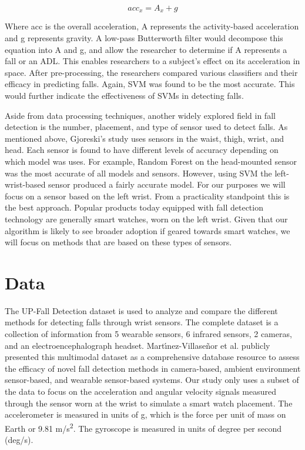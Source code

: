 \documentclass{llncs}
\begin{document}
    \begin{equation*}
    	acc_{x} = A_{x} + g
    \end{equation*}
    
    Where acc is the overall acceleration, A represents the activity-based acceleration and g represents gravity. A low-pass Butterworth filter would decompose this equation into A and g, and allow the researcher to determine if A represents a fall or an ADL. This enables researchers to a subject's effect on its acceleration in space. After pre-processing, the researchers compared various classifiers and their efficacy in predicting falls. Again, SVM was found to be the most accurate. This would further indicate the effectiveness of SVMs in detecting falls. \cite{hussainelderly2019}
    
    Aside from data processing techniques, another widely explored field in fall detection is the number, placement, and type of sensor used to detect falls. As mentioned above, Gjoreski's study uses sensors in the waist, thigh, wrist, and head. Each sensor is found to have different levels of accuracy depending on which model was uses. For example, Random Forest on the head-mounted sensor was the most accurate of all models and sensors. However, using SVM the left-wrist-based sensor produced a fairly accurate model. \cite{gjoreski2016accurately} For our purposes we will focus on a sensor based on the left wrist. From a practicality standpoint this is the best approach. Popular products today equipped with fall detection technology are generally smart watches, worn on the left wrist. Given that our algorithm is likely to see broader adoption if geared towards smart watches, we will focus on methods that are based on these types of sensors.
     
\section{Data}

The UP-Fall Detection dataset is used to analyze and compare the different methods for detecting falls through wrist sensors. The complete dataset is a collection of information from 5 wearable sensors, 6 infrared sensors, 2 cameras, and an electroencephalograph headset. Mart{\'\i}nez-Villase{\~n}or et al. publicly presented this multimodal dataset as a comprehensive database resource to assess the efficacy of novel fall detection methods in camera-based, ambient environment sensor-based, and wearable sensor-based systems. \cite{martinez2019up} Our study only uses a subset of the data to focus on the acceleration and angular velocity signals measured through the sensor worn at the wrist to simulate a smart watch placement. The accelerometer is measured in units of g, which is the force per unit of mass on Earth or 9.81 m/s\textsuperscript{2}. The gyroscope is measured in units of degree per second (deg/s).
 
\end{document}

